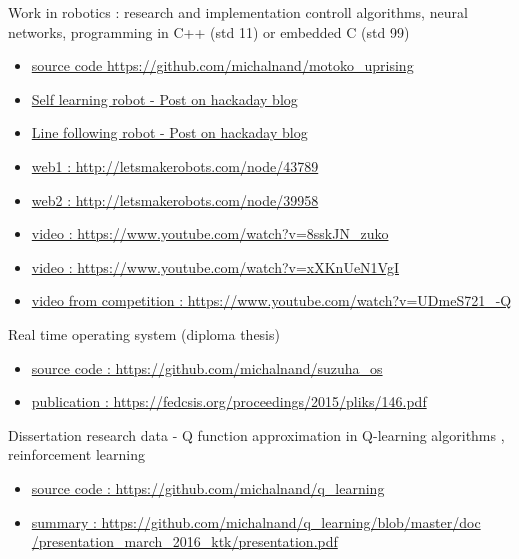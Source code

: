 \documentclass[10pt]{article}
\begin{document}
Work in robotics  : research and implementation controll algorithms, neural networks,
programming in C++ (std 11) or embedded C (std 99)
\begin{itemize}
\item \href{https://github.com/michalnand/motoko\_uprising}{source code https://github.com/michalnand/motoko\_uprising}
\item \href{https://hackaday.io/project/19924-self-learning-robot}{Self learning robot - Post on hackaday blog}
\item \href{https://hackaday.io/project/163799-motoko-uprising-deep-neural-network-line-following}{Line following robot - Post on hackaday blog}
\item \href{http://letsmakerobots.com/node/43789}{web1 : http://letsmakerobots.com/node/43789}
\item \href{http://letsmakerobots.com/node/39958}{web2 : http://letsmakerobots.com/node/39958}
\item \href{https://www.youtube.com/watch?v=8sskJN\_zuko}{video : https://www.youtube.com/watch?v=8sskJN\_zuko}
\item \href{https://www.youtube.com/watch?v=xXKnUeN1VgI}{video : https://www.youtube.com/watch?v=xXKnUeN1VgI}
\item \href{https://www.youtube.com/watch?v=UDmeS721\_-Q}{video from competition : https://www.youtube.com/watch?v=UDmeS721\_-Q}
\end{itemize}

Real time operating system (diploma thesis)

\begin{itemize}
\item \href{https://github.com/michalnand/suzuha\_os}{source code : https://github.com/michalnand/suzuha\_os}
\item \href{https://fedcsis.org/proceedings/2015/pliks/146.pdf}{publication : https://fedcsis.org/proceedings/2015/pliks/146.pdf}
\end{itemize}

Dissertation research data - Q function approximation in Q-learning algorithms
, reinforcement learning
\begin{itemize}
\item \href{https://github.com/michalnand/q\_learning}{source code : https://github.com/michalnand/q\_learning}
\item \href{https://github.com/michalnand/q\_learning/blob/master/doc/presentation\_march\_2016\_ktk/presentation.pdf}{summary : https://github.com/michalnand/q\_learning/blob/master/doc\\
                  /presentation\_march\_2016\_ktk/presentation.pdf}
\end{itemize}
\end{document}
